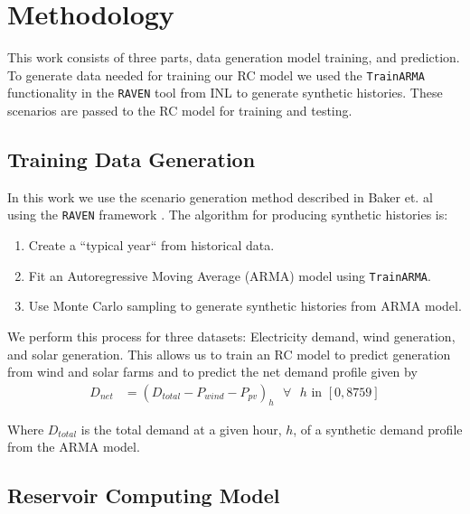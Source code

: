 \section{Methodology}

This work consists of three parts, data generation model training, and
prediction. To generate
data needed for training our RC model we used the \texttt{TrainARMA}
functionality
in the \texttt{RAVEN} tool from INL to generate synthetic histories. These
scenarios
are passed to the RC model for training and testing.

\subsection{Training Data Generation}
In this work we use the scenario generation method described in Baker et. al
using the \texttt{RAVEN} framework \cite{baker_optimal_2018}. The algorithm for
producing synthetic histories is:
\begin{enumerate}
	\item Create a ``typical year`` from historical data.
	\item Fit an Autoregressive Moving Average (ARMA) model using
	\texttt{TrainARMA}.
	\item Use Monte Carlo sampling to generate synthetic histories from ARMA
	 model.
\end{enumerate}

We perform this process for three datasets: Electricity demand, wind generation,
and solar generation. This allows us to train an RC model to predict generation
from wind and solar farms and to predict the net demand profile given by
\begin{equation}
	\label{eqn:net-demand}
	\begin{split}
		D_{net} & = (D_{total} - P_{wind} - P_{pv})_h \text{ $\forall$ $h$ in }
		[0,8759]
	\end{split}
\end{equation}

Where $D_{total}$ is the total demand at a given hour, $h$, of a synthetic
demand profile from the
ARMA model.

\subsection{Reservoir Computing Model}

